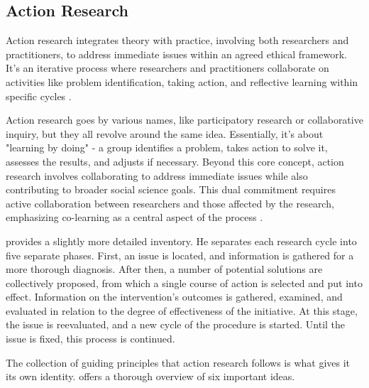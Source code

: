 \subsection{Action Research}
\par{Action research integrates theory with practice, involving both researchers and practitioners, to address immediate issues within an agreed ethical framework. It's an iterative process where researchers and practitioners collaborate on activities like problem identification, taking action, and reflective learning within specific cycles \citep{avison1999action}.}
\par{Action research goes by various names, like participatory research or collaborative inquiry, but they all revolve around the same idea. Essentially, it's about "learning by doing" - a group identifies a problem, takes action to solve it, assesses the results, and adjusts if necessary. Beyond this core concept, action research involves collaborating to address immediate issues while also contributing to broader social science goals. This dual commitment requires active collaboration between researchers and those affected by the research, emphasizing co-learning as a central aspect of the process \citep{o1998overview}.}
\par{\cite{susman1983action} provides a slightly more detailed inventory. He separates each research cycle into five separate phases. First, an issue is located, and information is gathered for a more thorough diagnosis. After then, a number of potential solutions are collectively proposed, from which a single course of action is selected and put into effect. Information on the intervention's outcomes is gathered, examined, and evaluated in relation to the degree of effectiveness of the initiative. At this stage, the issue is reevaluated, and a new cycle of the procedure is started. Until the issue is fixed, this process is continued.}
\par{The collection of guiding principles that action research follows is what gives it its own identity. \cite{winter1987action} offers a thorough overview of six important ideas.}

